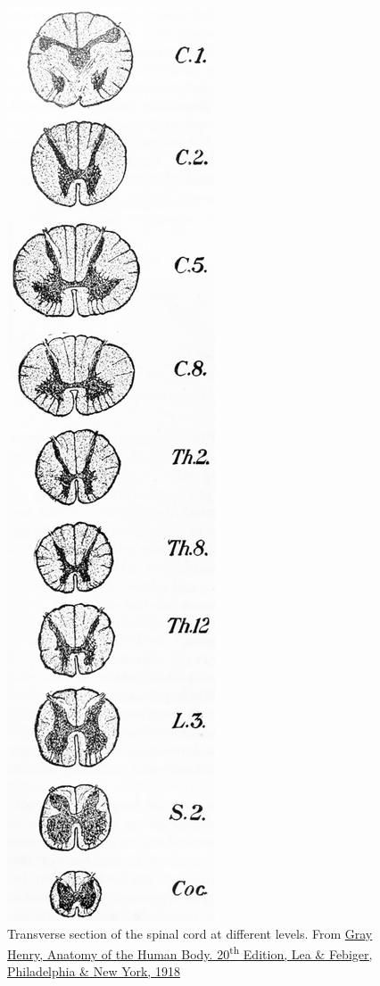 \begin{figure}

{\centering \includegraphics[width=0.7\linewidth]{./figures/cns/GrayAnat1918p754} 

}

\caption{Transverse section of the spinal cord at different levels. From \href{https://archive.org/details/anatomyofhumanbo1918gray/page/n6/mode/2up}{Gray Henry, Anatomy of the Human Body. 20\textsuperscript{th} Edition, Lea \& Febiger, Philadelphia \& New York, 1918}}\label{fig:spinalcrossections}
\end{figure}

